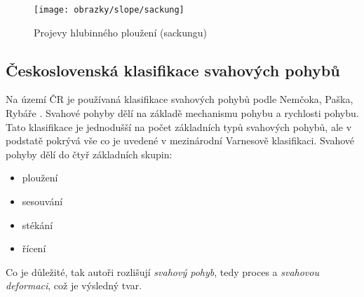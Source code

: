 \begin{figure}[h]
	\centering
	\texttt{[image: obrazky/slope/sackung]}
	\caption{Projevy hlubinného ploužení (sackungu) \parencite[podle][]{agliardiStructuralConstraintsDeepseated2001}}
	\label{fig:sackung}
\end{figure}

\subsection{Československá klasifikace svahových pohybů}
Na území ČR je používaná klasifikace svahových pohybů podle Nemčoka, Paška, Rybáře \parencite*{nemcokDeleniSvahovychPohybu1974}. Svahové pohyby dělí na základě mechanismu pohybu a rychlosti pohybu. Tato klasifikace je jednodušší na počet základních typů svahových pohybů, ale v podstatě pokrývá vše co je uvedené v mezinárodní Varnesově klasifikaci. Svahové pohyby dělí do čtyř základních skupin:
\begin{itemize}
	\item ploužení
	\item sesouvání 
	\item stékání
	\item řícení
\end{itemize}

Co je důležité, tak autoři rozlišují \emph{svahový pohyb}, tedy proces a \emph{svahovou deformaci}, což je výsledný tvar. 

